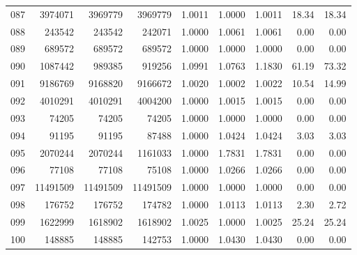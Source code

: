 \begin{longtable}{crrrrrrrr}
087 & 3974071 & 3969779 & 3969779 & 1.0011 & 1.0000 & 1.0011 & 18.34 & 18.34 \\
088 & 243542 & 243542 & 242071 & 1.0000 & 1.0061 & 1.0061 & 0.00 & 0.00 \\
089 & 689572 & 689572 & 689572 & 1.0000 & 1.0000 & 1.0000 & 0.00 & 0.00 \\
090 & 1087442 & 989385 & 919256 & 1.0991 & 1.0763 & 1.1830 & 61.19 & 73.32 \\
091 & 9186769 & 9168820 & 9166672 & 1.0020 & 1.0002 & 1.0022 & 10.54 & 14.99 \\
092 & 4010291 & 4010291 & 4004200 & 1.0000 & 1.0015 & 1.0015 & 0.00 & 0.00 \\
093 & 74205 & 74205 & 74205 & 1.0000 & 1.0000 & 1.0000 & 0.00 & 0.00 \\
094 & 91195 & 91195 & 87488 & 1.0000 & 1.0424 & 1.0424 & 3.03 & 3.03 \\
095 & 2070244 & 2070244 & 1161033 & 1.0000 & 1.7831 & 1.7831 & 0.00 & 0.00 \\
096 & 77108 & 77108 & 75108 & 1.0000 & 1.0266 & 1.0266 & 0.00 & 0.00 \\
097 & 11491509 & 11491509 & 11491509 & 1.0000 & 1.0000 & 1.0000 & 0.00 & 0.00 \\
098 & 176752 & 176752 & 174782 & 1.0000 & 1.0113 & 1.0113 & 2.30 & 2.72 \\
099 & 1622999 & 1618902 & 1618902 & 1.0025 & 1.0000 & 1.0025 & 25.24 & 25.24 \\
100 & 148885 & 148885 & 142753 & 1.0000 & 1.0430 & 1.0430 & 0.00 & 0.00 \\
\end{longtable}


